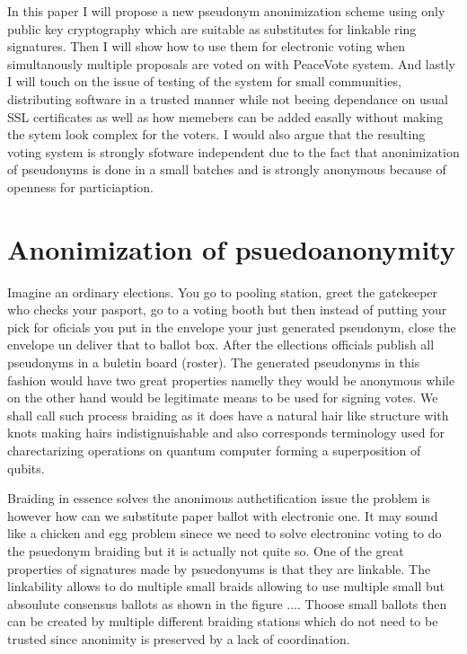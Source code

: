 \documentclass{article}
\begin{document}
In this paper I will propose a new pseudonym anonimization scheme using only public key cryptography which are suitable as substitutes for linkable ring signatures. Then I will show how to use them for electronic voting when simultanously multiple proposals are voted on with PeaceVote system. And lastly I will touch on the issue of testing of the system for small communities, distributing software in a trusted manner while not beeing dependance on usual SSL certificates as well as how memebers can be added easally without making the sytem look complex for the voters. I would also argue that the resulting voting system is strongly sfotware independent due to the fact that anonimization of pseudonyms is done in a small batches and is strongly anonymous because of openness for particiaption. 

\section{Anonimization of psuedoanonymity}

Imagine an ordinary elections. You go to pooling station, greet the gatekeeper who checks your pasport, go to a voting booth but then instead of putting your pick for oficials you put in the envelope your just generated pseudonym, close the envelope un deliver that to ballot box. After the ellections officials publish all pseudonyms in a buletin board (roster). The generated pseudonyms in this fashion would have two great properties namelly they would be anonymous while on the other hand would be legitimate means to be used for signing votes. We shall call such process braiding as it does have a natural hair like structure with knots making hairs indistignuishable and also corresponds terminology used for charectarizing operations on quantum computer forming a superposition of qubits.

Braiding in essence solves the anonimous authetification issue the problem is however how can we substitute paper ballot with electronic one. It may sound like a chicken and egg problem sinece we need to solve electroninc voting to do the psuedonym braiding but it is actually not quite so. One of the great properties of signatures made by psuedonyums is that they are linkable. The linkability allows to do multiple small braids allowing to use multiple small but absoulute consensus ballots as shown in the figure .... Thoose small ballots then can be created by multiple different braiding stations which do not need to be trusted since anonimity is preserved by a lack of coordination. 
\end{document}
